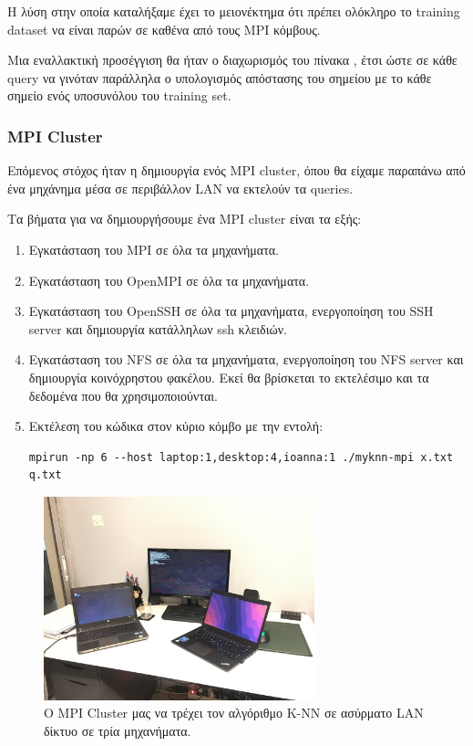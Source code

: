 \documentclass[11pt]{scrartcl} %
\begin{document}
Η λύση στην οποία καταλήξαμε έχει το μειονέκτημα ότι πρέπει ολόκληρο το training dataset να είναι παρών σε καθένα από 
τους MPI κόμβους.

Μια εναλλακτική προσέγγιση θα ήταν ο διαχωρισμός του πίνακα , έτσι ώστε σε κάθε query
να γινόταν παράλληλα ο υπολογισμός απόστασης του σημείου  με το κάθε σημείο ενός υποσυνόλου του training set.

\subsubsection{MPI Cluster}

Επόμενος στόχος ήταν η δημιουργία ενός MPI cluster, όπου θα είχαμε παραπάνω από ένα μηχάνημα μέσα σε περιβάλλον LAN να εκτελούν τα queries.

Τα βήματα για να δημιουργήσουμε ένα MPI cluster είναι τα εξής:

\begin{enumerate}
\item Εγκατάσταση του MPI σε όλα τα μηχανήματα.
\item Εγκατάσταση του OpenMPI σε όλα τα μηχανήματα.
\item Εγκατάσταση του OpenSSH σε όλα τα μηχανήματα, ενεργοποίηση του SSH server και δημιουργία κατάλληλων ssh κλειδιών.
\item Εγκατάσταση του NFS \cite{nfs} σε όλα τα μηχανήματα, ενεργοποίηση του NFS server και
        δημιουργία κοινόχρηστου φακέλου. Εκεί θα βρίσκεται το εκτελέσιμο και τα
        δεδομένα που θα χρησιμοποιούνται.
\item Εκτέλεση του κώδικα στον κύριο κόμβο με την εντολή:
\begin{lstlisting}
mpirun -np 6 --host laptop:1,desktop:4,ioanna:1 ./myknn-mpi x.txt q.txt
\end{lstlisting}
\end{enumerate}

\begin{figure}
    \begin{center}
        \includegraphics[width=0.7\textwidth]{assets/mpi_cluster.png}
    \end{center}
    \caption{Ο MPI Cluster μας να τρέχει τον αλγόριθμο K-NN σε ασύρματο LAN δίκτυο σε τρία μηχανήματα.}
    \label{fig:}
\end{figure}
\end{document}
